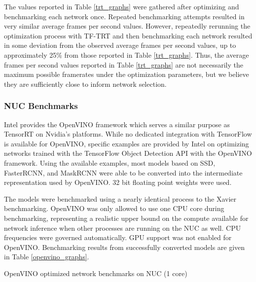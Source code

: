 The values reported in Table \ref{trt_graphs} were gathered after optimizing and benchmarking each network once. Repeated benchmarking attempts resulted in very similar average frames per second values. However, repeatedly rerunning the optimization process with TF-TRT and then benchmarking each network resulted in some deviation from the observed average frames per second values, up to approximately 25\% from those reported in Table \ref{trt_graphs}. Thus, the average frames per second values reported in Table \ref{trt_graphs} are not necessarily the maximum possible framerates under the optimization parameters, but we believe they are sufficiently close to inform network selection.

\subsubsection{NUC Benchmarks}

Intel provides the OpenVINO framework which serves a similar purpose as TensorRT on Nvidia's platforms. While no dedicated integration with TensorFlow is available for OpenVINO, specific examples are provided by Intel on optimizing networks trained with the TensorFlow Object Detection API with the OpenVINO framework. Using the available examples, most models based on SSD, FasterRCNN, and MaskRCNN were able to be converted into the intermediate representation used by OpenVINO. 32 bit floating point weights were used.

The models were benchmarked using a nearly identical process to the Xavier benchmarking. OpenVINO was only allowed to use one CPU core during benchmarking, representing a realistic upper bound on the compute available for network inference when other processes are running on the NUC as well. CPU frequencies were governed automatically. GPU support was not enabled for OpenVINO. Benchmarking results from successfully converted models are given in Table \ref{openvino_graphs}.

\begin{table}
	\centering
	\begin{adjustbox}{max width=.9\textwidth}
	\end{adjustbox}
	\caption{OpenVINO optimized network benchmarks on NUC (1 core)}
	\label{openvino_graphs}
\end{table}

